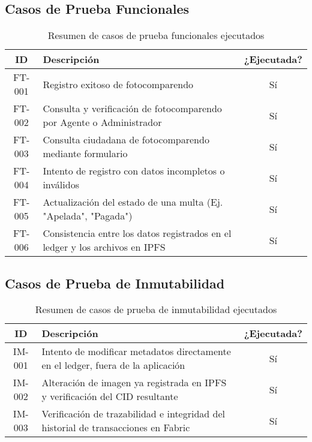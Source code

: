 
\subsection{Casos de Prueba Funcionales}

\begin{table}[htbp]
\centering
\begin{tabular}{|c|p{8cm}|c|}
\hline
\textbf{ID} & \textbf{Descripción} & \textbf{¿Ejecutada?} \\
\hline
FT-001 & Registro exitoso de fotocomparendo &  Sí \\
\hline
FT-002 & Consulta y verificación de fotocomparendo por Agente o Administrador &  Sí \\
\hline
FT-003 & Consulta ciudadana de fotocomparendo mediante formulario & Sí \\
\hline
FT-004 & Intento de registro con datos incompletos o inválidos & Sí \\
\hline
FT-005 & Actualización del estado de una multa (Ej. "Apelada", "Pagada") & Sí \\
\hline
FT-006 & Consistencia entre los datos registrados en el ledger y los archivos en IPFS & Sí \\
\hline
\end{tabular}
\caption{Resumen de casos de prueba funcionales ejecutados}
\end{table}

\subsection{Casos de Prueba de Inmutabilidad}

\begin{table}[H]
\centering
\begin{tabular}{|c|p{8cm}|c|}
\hline
\textbf{ID} & \textbf{Descripción} & \textbf{¿Ejecutada?} \\
\hline
IM-001 & Intento de modificar metadatos directamente en el ledger, fuera de la aplicación & Sí \\
\hline
IM-002 & Alteración de imagen ya registrada en IPFS y verificación del CID resultante & Sí \\
\hline
IM-003 & Verificación de trazabilidad e integridad del historial de transacciones en Fabric & Sí \\
\hline
\end{tabular}
\caption{Resumen de casos de prueba de inmutabilidad ejecutados}
\end{table}


